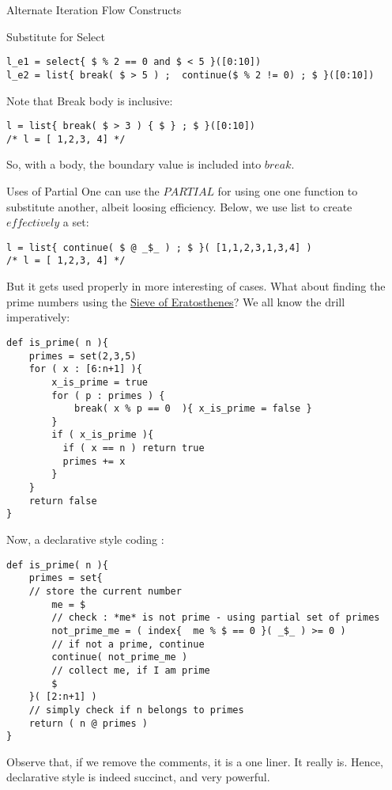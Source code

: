 \begin{section}{Alternate Iteration Flow Constructs}
\begin{subsection}{Substitute for Select}
\begin{lstlisting}[style=JexlStyle]
l_e1 = select{ $ % 2 == 0 and $ < 5 }([0:10])
l_e2 = list{ break( $ > 5 ) ;  continue($ % 2 != 0) ; $ }([0:10])
\end{lstlisting}

Note that Break body is inclusive:
  
\begin{lstlisting}[style=JexlStyle]
l = list{ break( $ > 3 ) { $ } ; $ }([0:10])
/* l = [ 1,2,3, 4] */
\end{lstlisting}
 
So, with a body, the boundary value is included into $break$.
\end{subsection}

\begin{subsection}{Uses of Partial}
One can use the $PARTIAL$ for using one one function to substitute another,
albeit loosing efficiency.
Below, we use list to create $effectively$ a set:

\begin{lstlisting}[style=JexlStyle]
l = list{ continue( $ @ _$_ ) ; $ }( [1,1,2,3,1,3,4] )
/* l = [ 1,2,3, 4] */
\end{lstlisting}

But it gets used properly in more interesting of cases.
What about finding the prime numbers using the \href{https://en.wikipedia.org/wiki/Sieve_of_Eratosthenes}{Sieve of Eratosthenes}?
We all know the drill imperatively:

\begin{lstlisting}[style=JexlStyle]
def is_prime( n ){
    primes = set(2,3,5)
    for ( x : [6:n+1] ){
        x_is_prime = true 
        for ( p : primes ) {
            break( x % p == 0  ){ x_is_prime = false }
        }
        if ( x_is_prime ){
          if ( x == n ) return true 
          primes += x 
        }
    }
    return false 
}
\end{lstlisting}
Now, a declarative style coding :
\begin{lstlisting}[style=JexlStyle]
def is_prime( n ){
    primes = set{
    // store the current number
        me = $
        // check : *me* is not prime - using partial set of primes
        not_prime_me = ( index{  me % $ == 0 }( _$_ ) >= 0 ) 
        // if not a prime, continue 
        continue( not_prime_me )
        // collect me, if I am prime 
        $   
    }( [2:n+1] )
    // simply check if n belongs to primes
    return ( n @ primes )  
}
\end{lstlisting}
Observe that, if we remove the comments, it is a one liner. 
It really is. Hence, declarative style is indeed succinct, and very powerful.

\end{subsection}

\end{section}



